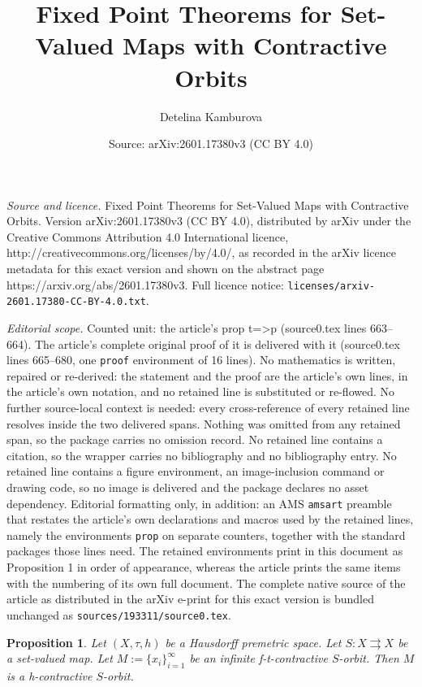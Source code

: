 \documentclass[10pt,a4paper]{amsart}
\title{Fixed Point Theorems for Set-Valued Maps with Contractive Orbits}
\author{Detelina Kamburova}
\date{Source: arXiv:2601.17380v3 (CC BY 4.0)}
\newtheorem{prop}{Proposition}
\begin{document}
\maketitle

\noindent\emph{Source and licence.} Fixed Point Theorems for Set-Valued Maps with Contractive Orbits. Version arXiv:2601.17380v3 (CC BY 4.0), distributed by arXiv under the Creative Commons Attribution 4.0 International licence, http://creativecommons.org/licenses/by/4.0/, as recorded in the arXiv licence metadata for this exact version and shown on the abstract page https://arxiv.org/abs/2601.17380v3. Full licence notice: \texttt{licenses/arxiv-2601.17380-CC-BY-4.0.txt}.\par\smallskip

\noindent\textit{Editorial scope.} Counted unit: the article's prop t=>p (source0.tex lines 663--664). The article's complete original proof of it is delivered with it (source0.tex lines 665--680, one \texttt{proof} environment of 16 lines). No mathematics is written, repaired or re-derived: the statement and the proof are the article's own lines, in the article's own notation, and no retained line is substituted or re-flowed.  No further source-local context is needed: every cross-reference of every retained line resolves inside the two delivered spans.  Nothing was omitted from any retained span, so the package carries no omission record.  No retained line contains a citation, so the wrapper carries no bibliography and no bibliography entry.  No retained line contains a figure environment, an image-inclusion command or drawing code, so no image is delivered and the package declares no asset dependency.  Editorial formatting only, in addition: an AMS \texttt{amsart} preamble that restates the article's own declarations and macros used by the retained lines, namely the environments \texttt{prop} on separate counters, together with the standard packages those lines need.  The retained environments print in this document as Proposition 1 in order of appearance, whereas the article prints the same items with the numbering of its own full document.  The complete native source of the article as distributed in the arXiv e-print for this exact version is bundled unchanged as \texttt{sources/193311/source0.tex}.
\begin{prop} \label{t=>p}  Let $(X, \tau, h)$ be a Hausdorff premetric space. Let $S:X \rightrightarrows X$ be a set-valued map. Let $M:=\{x_i\}_{i=1}^{\infty}$ be an infinite f-t-contractive $S$-orbit. Then $M$ is a h-contractive $S$-orbit.
\end{prop}
\end{document}
